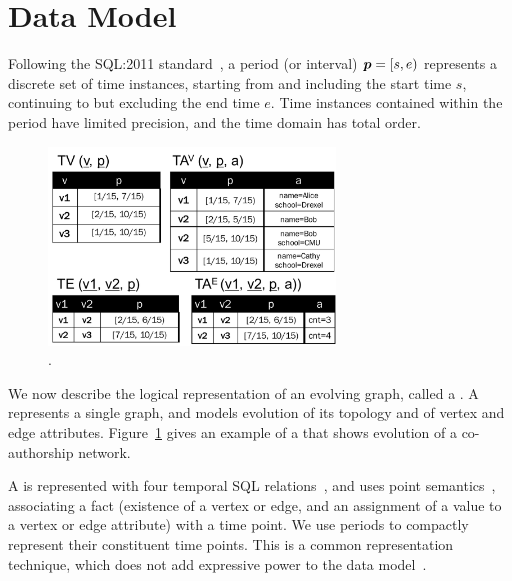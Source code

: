 \section{Data Model}
\label{sec:model}

Following the SQL:2011
standard~\cite{DBLP:journals/sigmod/KulkarniM12}, a period (or
interval) $\boldsymbol{p} = [s, e)$ represents a discrete set of time instances,
  starting from and including the start time $s$, continuing to but
  excluding the end time $e$.  Time instances contained within the
  period have limited precision, and the time domain has total order.


\begin{figure}[t!]
\centering
\includegraphics[width=3in]{figs/T1_rel.pdf}
\caption{\tg {}.}
\vspace{-0.5cm}
\label{fig:tg_ve}
\end{figure}

We now describe the logical representation of an evolving graph,
called a \tg.  A \tg represents a single graph, and models evolution
of its topology and of vertex and edge attributes.
Figure~\ref{fig:tg_ve} gives an example of a \tg that shows evolution
of a co-authorship network.

A \tg is represented with four temporal SQL
relations~\cite{DBLP:conf/vldb/BohlenSS96}, and uses point
semantics~\cite{DBLP:reference/db/Toman09}, associating a fact
(existence of a vertex or edge, and an assignment of a value to a
vertex or edge attribute) with a time point.  We use periods to
compactly represent their constituent time points.  This is a common
representation technique, which does not add expressive power to the
data model~\cite{DBLP:conf/ictl/Chomicki94}.

